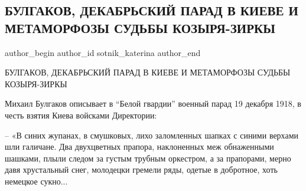  
 
 
 
 
 
\subsection{БУЛГАКОВ, ДЕКАБРЬСКИЙ ПАРАД В КИЕВЕ И МЕТАМОРФОЗЫ СУДЬБЫ КОЗЫРЯ-ЗИРКЫ}
\label{sec:07_11_2019.fb.sotnik_katerina.1.bulgakov_parad_kiev}
 
\ifcmt
 author_begin
   author_id sotnik_katerina
 author_end
\fi

БУЛГАКОВ, ДЕКАБРЬСКИЙ ПАРАД В КИЕВЕ И МЕТАМОРФОЗЫ СУДЬБЫ КОЗЫРЯ-ЗИРКЫ 

Михаил Булгаков описывает в \enquote{Белой гвардии} военный парад 19 декабря 1918, в
честь взятия Киева войсками Директории:

– «В синих жупанах, в смушковых, лихо заломленных шапках с синими верхами шли
галичане. Два двухцветных прапора, наклоненных меж обнаженными шашками, плыли
следом за густым трубным оркестром, а за прапорами, мерно давя хрустальный
снег, молодецки гремели ряды, одетые в добротное, хоть немецкое сукно...






